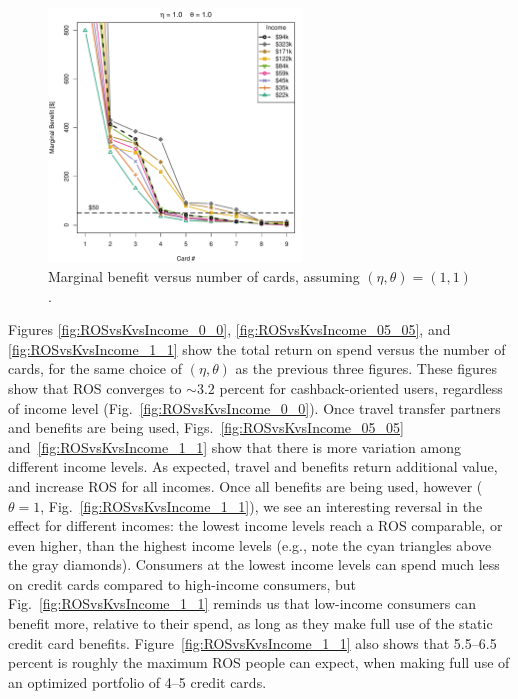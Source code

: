 \begin{figure}[tbh]
    \begin{center}
    \includegraphics[width=0.6\textwidth]{../Figures/MBvsKvsIncome_1_1.pdf}
    \caption{Marginal benefit versus number of cards, assuming $(\eta, \theta) = (1,1)$.}
    \label{fig:MBvsKvsIncome_1_1}
    \end{center}
\end{figure}

\clearpage
Figures \ref{fig:ROSvsKvsIncome_0_0}, \ref{fig:ROSvsKvsIncome_05_05}, and \ref{fig:ROSvsKvsIncome_1_1} show the total return on spend versus the number of cards, for the same choice of $(\eta, \theta)$ as the previous three figures. 
These figures show that ROS converges to $\sim3.2$ percent for cashback-oriented users, regardless of income level (Fig.~\ref{fig:ROSvsKvsIncome_0_0}).
Once travel transfer partners and benefits are being used, Figs.~\ref{fig:ROSvsKvsIncome_05_05} and~\ref{fig:ROSvsKvsIncome_1_1} show that there is more variation among different income levels. 
As expected, travel and benefits return additional value, and increase ROS for all incomes.
Once all benefits are being used, however ($\theta = 1$, Fig.~\ref{fig:ROSvsKvsIncome_1_1}), we see an interesting reversal in the effect for different incomes: the lowest income levels reach a ROS comparable, or even higher, than the highest income levels (e.g., note the cyan triangles above the gray diamonds). 
Consumers at the lowest income levels can spend much less on credit cards compared to high-income consumers, but Fig.~\ref{fig:ROSvsKvsIncome_1_1} reminds us that low-income consumers can benefit more, relative to their spend, as long as they make full use of the static credit card benefits.
Figure~\ref{fig:ROSvsKvsIncome_1_1} also shows that 5.5--6.5 percent is roughly the maximum ROS people can expect, when making full use of an optimized portfolio of 4--5 credit cards.
 
